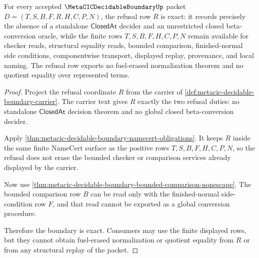 \begin{theorem}
\label{thm:metacic-decidable-boundary-refusal-exactness}
For every accepted $\MetaCICDecidableBoundaryUp$ packet $D=(T,S,B,F,R,H,C,P,N)$, the refusal row $R$ is exact: it records precisely the absence of a standalone $\mathsf{ClosedAt}$ decider and an unrestricted closed beta-conversion oracle, while the finite rows $T,S,B,F,H,C,P,N$ remain available for checker reads, structural equality reads, bounded comparison, finished-normal side conditions, componentwise transport, displayed replay, provenance, and local naming. The refusal row exports no fuel-erased normalization theorem and no quotient equality over represented terms.
\end{theorem}
\begin{proof}
Project the refusal coordinate $R$ from the carrier of \autoref{def:metacic-decidable-boundary-carrier}. The carrier text gives $R$ exactly the two refusal duties: no standalone $\mathsf{ClosedAt}$ decision theorem and no global closed beta-conversion decider.

Apply \autoref{thm:metacic-decidable-boundary-namecert-obligations}. It keeps $R$ inside the same finite NameCert surface as the positive rows $T,S,B,F,H,C,P,N$, so the refusal does not erase the bounded checker or comparison services already displayed by the carrier.

Now use \autoref{thm:metacic-decidable-boundary-bounded-comparison-nonescape}. The bounded comparison row $B$ can be read only with the finished-normal side-condition row $F$, and that read cannot be exported as a global conversion procedure.

Therefore the boundary is exact. Consumers may use the finite displayed rows, but they cannot obtain fuel-erased normalization or quotient equality from $R$ or from any structural replay of the packet.
\end{proof}

